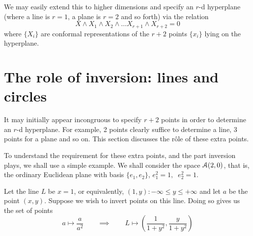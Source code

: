 We may easily extend this to higher dimensions and specify an $r$-d 
hyperplane (where a line is $r=1$, a plane is $r=2$ and so forth) via
the relation
%
\begin{equation}
  X\wedge X_1 \wedge X_2 \wedge \ldots  X_{r+1} \wedge X_{r+2} = 0
     \end{equation}
%
where $\{X_i\}$ are conformal representations
of the $r+2$ points $\{x_i\}$ lying on the hyperplane.

\section{The role of inversion: lines and circles}

It may initially appear incongruous to specify $r+2$ points in order to
determine an $r$-d hyperplane. For example, 2 points clearly suffice to
determine a line, 3 points for a plane and so on. This section discusses the
r\^ole of these extra points.

To understand the requirement for these extra points, and the part inversion
plays, we shall use a simple example. We shall consider the space
${\mathcal{A}}(2,0)$, that is, the ordinary Euclidean plane with basis $\{e_1,e_2\}$,
$e_1^2=1,\;\; e_2^2=1$.

Let the line $L$ be $x=1$, or equivalently, $(1,y) : -\infty \le y \le
+\infty$ and let $a$ be the point $(x,y)$. Suppose we wish to invert
points on this line. Doing so gives us the set of points
%
\begin{equation}
a \mapsto \frac{a}{a^2} \qquad \implies \qquad L \mapsto
\left( \frac{1}{1+y^2}, \frac{y}{1+y^2}\right)
\end{equation}

